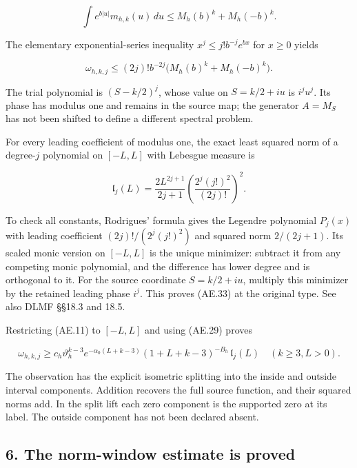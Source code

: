 \[
 \int e^{b|u|}m_{h,k}(u)\,du
 \le M_h(b)^k+M_h(-b)^k.                                                \tag{AE.31}\label{AE.eq.31}
\]

The elementary exponential-series inequality \(x^j\le j!b^{-j}e^{bx}\)
for \(x\ge0\) yields

\[
 \omega_{h,k,j}
 \le (2j)!b^{-2j}\bigl(M_h(b)^k+M_h(-b)^k\bigr).                       \tag{AE.32}\label{AE.eq.32}
\]

The trial polynomial is \((S-k/2)^j\), whose value on \(S=k/2+iu\) is
\(i^ju^j\). Its phase has modulus one and remains in the source map; the
generator \(A=M_S\) has not been shifted to define a different spectral
problem.

For every leading coefficient of modulus one, the exact least squared
norm of a degree-\(j\) polynomial on \([-L,L]\) with Lebesgue measure is

\[
 \mathfrak l_j(L)=
 \frac{2L^{2j+1}}{2j+1}
       \left(\frac{2^j(j!)^2}{(2j)!}\right)^2.                           \tag{AE.33}\label{AE.eq.33}
\]

To check all constants, Rodrigues' formula gives the Legendre polynomial
\(P_j(x)\) with leading coefficient \((2j)!/(2^j(j!)^2)\) and squared
norm \(2/(2j+1)\). Its scaled monic version on \([-L,L]\) is the unique
minimizer: subtract it from any competing monic polynomial, and the
difference has lower degree and is orthogonal to it. For the source
coordinate \(S=k/2+iu\), multiply this minimizer by the retained leading
phase \(i^j\). This proves (AE.33) at the original type. See also DLMF
§§18.3 and 18.5.

Restricting (AE.11) to \([-L,L]\) and using (AE.29) proves

\[
 \boxed{
 \omega_{h,k,j}\ge
 c_h\vartheta_h^{k-3}
 e^{-\alpha_0(L+k-3)}(1+L+k-3)^{-B_h}\,\mathfrak l_j(L)
 \quad(k\ge3,L>0).}                                                    \tag{AE.34}\label{AE.eq.34}
\]

The observation has the explicit isometric splitting into the inside and
outside interval components. Addition recovers the full source function,
and their squared norms add. In the split lift each zero component is
the supported zero at its label. The outside component has not been
declared absent.

\subsection*{6. The norm-window estimate is
proved}
\label{AE.the-norm-window-estimate-is-proved}

